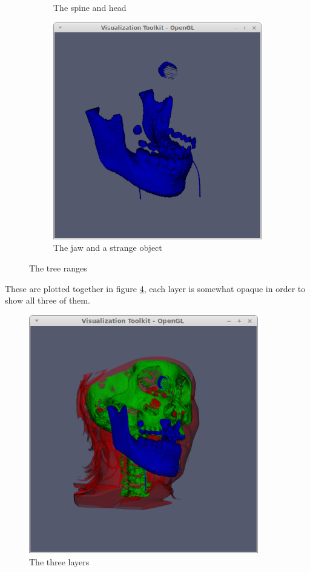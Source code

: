 \documentclass{article}[10pt]
\begin{document}
\begin{figure}[h]
\begin{subfigure}[b]{0.3\textwidth}
                \caption{The spine and head}
                \label{fig:green}
        \end{subfigure}
        \begin{subfigure}[b]{0.3\textwidth}
                \includegraphics[width=\textwidth]{blue}
                \caption{The jaw and a strange object}
                \label{fig:blue}
        \end{subfigure}
        \caption{The tree ranges}\label{fig:animals}
\end{figure}

These are plotted together in figure \ref{fig:rgb}, each layer is somewhat
opaque in order to show all three of them.

\begin{figure}[h]
\centering
    \includegraphics[width=10cm]{rgb}
    \caption{The three layers}
    \label{fig:rgb}
\end{figure}
\end{document}
